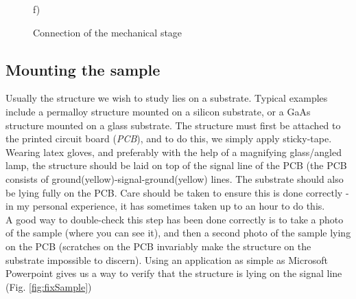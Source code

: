 \documentclass[14pt,a4paper] {article}
\begin{document}
\begin{figure}[pH]
\begin{minipage}[h]{0.5\linewidth}
 f)\\
\end{minipage}

\caption{Connection of the mechanical stage}
\label{fig:mStage}
\end{figure}

\newpage

\subsection{Mounting the sample}

Usually the structure we wish to study lies on a substrate. Typical examples include a permalloy structure mounted on a silicon substrate, or a GaAs structure mounted on a glass substrate. The structure must first be attached to the printed circuit board ({\it PCB}), and to do this, we simply apply sticky-tape. Wearing latex gloves, and preferably with the help of a magnifying glass/angled lamp, the structure should be laid on top of the signal line of the PCB (the PCB consists of ground(yellow)-signal-ground(yellow) lines. The substrate should also be lying fully on the PCB. Care should be taken to ensure this is done correctly - in my personal experience, it has sometimes taken up to an hour to do this.
\\

A good way to double-check this step has been done correctly is to take a photo of the sample (where you can see it), and then a second photo of the sample lying on the PCB (scratches on the PCB invariably make the structure on the substrate impossible to discern). Using an application as simple as Microsoft Powerpoint gives us a way to verify that the structure is lying on the signal line (Fig. \ref{fig:fixSample}) 
\end{document}
